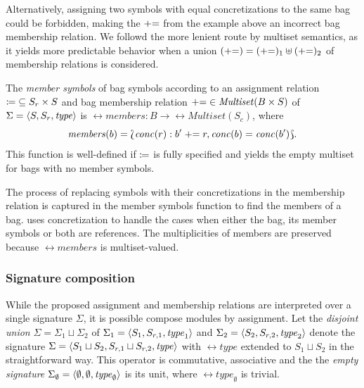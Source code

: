 Alternatively, assigning two symbols with equal concretizations to the same bag could be forbidden, making the \(\mathrel{{+}{=}}\) from the example above an incorrect bag membership relation. We followd the more lenient route by multiset semantics, as it yields more predictable behavior when a union \((\mathrel{{+}{=}}) = (\mathrel{{+}{=}})_1 \uplus (\mathrel{{+}{=}})_2\) of membership relations is considered.

\begin{dfn}
  The \emph{member symbols} of bag symbols according to an  assignment relation \({\coloneq} \subseteq S_r \times S\) and bag membership relation \({\mathrel{{+}{=}}} \in \textrm{\itshape Multiset\/}(B \times S)\) of \(\Sigma = \langle S, S_r, \textrm{\itshape type\/} \rangle\) is \(\rel{members}\colon B \to \rel{Multiset}(S_c)\), where
  \begin{equation}
    \label{eq:rgspn:member-symbols}
    \rel{members}(b) = \Lbag \rel{conc}(r) : b' \member r, \rel{conc}(b) = \rel{conc}(b')\Rbag \text.
  \end{equation}
  This function is well-defined if \(\coloneq\) is fully specified and yields the empty multiset for bags with no member symbols.
\end{dfn}

The process of replacing symbols with their concretizations in the membership relation is captured in the member symbols function to find the members of a bag.  uses concretization to handle the cases when either the bag, its member symbols or both are references. The multiplicities of members are preserved because \(\rel{members}\) is multiset-valued.

\subsubsection{Signature composition}

While the proposed assignment and membership relations are interpreted over a single signature \(\Sigma\), it is possible compose modules by  assignment. Let the \emph{disjoint union} \(\Sigma = \Sigma_1 \sqcup \Sigma_2\) of \(\Sigma_1 = \langle S_1, S_{r,1}, \textrm{\itshape type\/}_1 \rangle\) and \(\Sigma_2 = \langle S_2, S_{r,2}, \textrm{\itshape type\/}_2 \rangle\) denote the signature \(\Sigma = \langle S_1 \sqcup S_2, S_{r,1} \sqcup S_{r,2}, \textrm{\itshape type\/} \rangle\) with \(\rel{type}\) extended to \(S_1 \sqcup S_2\) in the straightforward way. This operator is commutative, associative and the the \emph{empty signature} \(\Sigma_\emptyset = \langle \emptyset, \emptyset, \textrm{\itshape type\/}_\emptyset\rangle\) is its unit, where \(\rel{type}_\emptyset\) is trivial.

